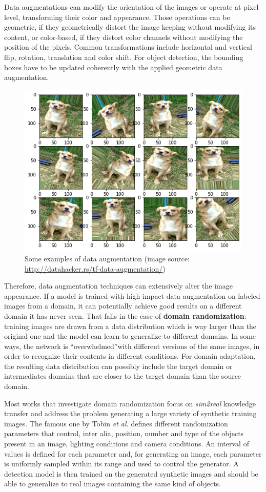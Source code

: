 \documentclass[%
    corpo=12pt,
    twoside,
    stile=classica,   
    tipotesi=magistrale,
    evenboxes,
    english
]{toptesi}
\begin{document}
Data augmentations can modify the orientation of the images or operate at pixel level, transforming their color and appearance. Those operations can be geometric, if they geometrically distort the image keeping without modifying its content, or color-based, if they distort color channels without modifying the position of the pixels. Common transformations include horizontal and vertical flip, rotation, translation and color shift. For object detection, the bounding boxes have to be updated coherently with the applied geometric data augmentation.

\begin{figure}[ht!]
	\centering
	\includegraphics[width=0.7\linewidth]{imgs/augmentation.png}
	\caption{Some examples of data augmentation (image source: \url{http://datahacker.rs/tf-data-augmentation/})}
	\label{fig:augmentation}
\end{figure}

Therefore, data augmentation techniques can extensively alter the image appearance. If a model is trained with high-impact data augmentation on labeled images from a domain, it can potentially achieve good results on a different domain it has never seen. That falls in the case of \textbf{domain randomization}: training images are drawn from a data distribution which is way larger than the original one and the model can learn to generalize to different domains. In some ways, the network is \textquotedblleft overwhelmed\textquotedblright with different versions of the same images, in order to recognize their contents in different conditions. For domain adaptation, the resulting data distribution can possibly include the target domain or intermediates domains that are closer to the target domain than the source domain.

Most works that investigate domain randomization focus on \textit{sim2real} knowledge transfer and address the problem generating a large variety of synthetic training images. The famous one by Tobin \textit{et al.}\cite{tobin2017domain} defines different randomization parameters that control, inter alia, position, number and type of the objects present in an image, lighting conditions and camera conditions. An interval of values is defined for each parameter and, for generating an image, each parameter is uniformly sampled within its range and used to control the generator. A detection model is then trained on the generated synthetic images and should be able to generalize to real images containing the same kind of objects.
\end{document}
